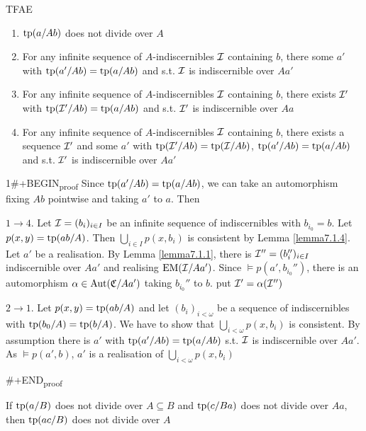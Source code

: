 \documentclass[11pt]{article}
\begin{document}
\begin{corollary}[]
TFAE
\begin{enumerate}
\item \(\operatorname{tp}(a/Ab)\) does not divide over \(A\)
\item For any infinite sequence of \(A\)-indiscernibles \(\mathcal{I}\) containing \(b\), there
some \(a'\) with \(\operatorname{tp}(a'/Ab)=\operatorname{tp}(a/Ab)\) and s.t. \(\mathcal{I}\) is indiscernible over \(Aa'\)
\item For any infinite sequence of \(A\)-indiscernibles \(\mathcal{I}\) containing \(b\), there exists \(\mathcal{I}'\)
with \(\operatorname{tp}(\mathcal{I}'/Ab)=\operatorname{tp}(a/Ab)\) and s.t. \(\mathcal{I}'\) is indiscernible over \(Aa\)
\item For any infinite sequence of \(A\)-indiscernibles \(\mathcal{I}\)  containing \(b\), there exists a
sequence \(\mathcal{I}'\) and some \(a'\) with \(\operatorname{tp}(\mathcal{I}'/Ab)=\operatorname{tp}(\mathcal{I}/Ab)\), \(\operatorname{tp}(a'/Ab)=\operatorname{tp}(a/Ab)\) and
s.t. \(\mathcal{I}'\) is indiscernible over \(Aa'\)
\end{enumerate}
\end{corollary}

1\#+BEGIN\textsubscript{proof}
Since \(\operatorname{tp}(a'/Ab)=\operatorname{tp}(a/Ab)\), we can take an automorphism fixing \(Ab\) pointwise and
taking \(a'\) to \(a\). Then

\(1\to 4\). Let \(\mathcal{I}=(b_i)_{i\in I}\) be an infinite sequence of indiscernibles with \(b_{i_0}=b\).
Let \(p(x,y)=\operatorname{tp}(ab/A)\). Then \(\bigcup_{i\in I}p(x,b_i)\) is consistent by Lemma \ref{lemma7.1.4}.
Let \(a'\) be a realisation. By Lemma \ref{lemma7.1.1}, there is \(\mathcal{I}''=(b_i'')_{i\in I}\)
indiscernible over \(Aa'\) and realising \(\operatorname{EM}(\mathcal{I}/Aa')\). Since \(\vDash p(a',b_{i_0}'')\), there is
an automorphism \(\alpha\in\operatorname{\text{Aut}}(\mathfrak{C}/Aa')\) taking \(b_{i_0}''\) to \(b\). put \(\mathcal{I}'=\alpha(\mathcal{I}'')\)

\(2\to 1\). Let \(p(x,y)=\operatorname{tp}(ab/A)\) and let \((b_i)_{i<\omega}\) be a sequence of indiscernibles
 with \(\operatorname{tp}(b_0/A)=\operatorname{tp}(b/A)\). We have to show that \(\bigcup_{i<\omega}p(x,b_i)\) is consistent.
By assumption there is \(a'\) with \(\operatorname{tp}(a'/Ab)=\operatorname{tp}(a/Ab)\) s.t. \(\mathcal{I}\) is indiscernible
over \(Aa'\).
As \(\vDash p(a',b)\), \(a'\) is a realisation of \(\bigcup_{i<\omega}p(x,b_i)\)

\#+END\textsubscript{proof}

\begin{proposition}[]
If \(\operatorname{tp}(a/B)\) does not divide over \(A\subseteq B\) and \(\operatorname{tp}(c/Ba)\) does not divide over \(Aa\),
then \(\operatorname{tp}(ac/B)\) does not divide over \(A\)
\end{proposition}
\end{document}
